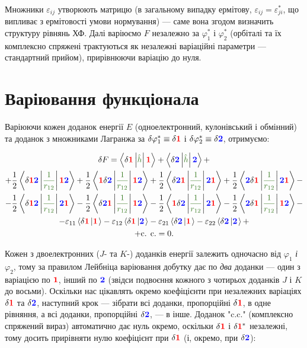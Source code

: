\documentclass[]{article}
\def\bracket#1#2{\left\langle #1\left| #2 \right. \right\rangle }
\def\opbracket#1#2#3{\left\langle #1\left| \textcolor{OliveGreen}{#2}\right|  #3 \right\rangle}
\let\vphi\varphi
\let\ve\varepsilon
\def\F{\textcolor{red}{\mathbf{1}}}
\def\S{\textcolor{blue}{\mathbf{2}}}
\def\h{\hat{h}}
\def\V{\frac{1}{r_{12}}}
\begin{document}
Множники $\ve_{ij}$ утворюють матрицю (в загальному випадку ермітову, $\ve_{ij}=\ve_{ji}^*$, що випливає з ермітовості умови нормування) --- саме вона згодом визначить структуру рівнянь ХФ. Далі варіюємо $F$ незалежно за $\vphi_1^*$ і $\vphi_2^*$ (орбіталі та їх комплексно спряжені трактуються як незалежні варіаційні параметри --- стандартний прийом), прирівнюючи варіацію до нуля.

\section{Варіювання функціонала}

Варіюючи кожен доданок енергії $E$ (одноелектронний, кулонівський і обмінний) та доданок з множниками Лагранжа за $\delta\vphi_1^*\equiv\delta\F$ і $\delta\vphi_2^*\equiv\delta\S$, отримуємо:

\begin{multline*}
    \delta F =  \opbracket{\delta\F}{\h}{\F} + \opbracket{\delta\S}{\h}{\S} + \\
    + \frac12\opbracket{\delta\F\S}{\V}{\F\S} + \frac12\opbracket{\F\delta\S}{\V}{\F\S} +
    \frac12\opbracket{\delta\S\F}{\V}{\S\F} + \frac12\opbracket{\S\delta\F}{\V}{\S\F} - \\
    - \frac12\opbracket{\delta\F\S}{\V}{\S\F} - \frac12\opbracket{\delta\S\F}{\V}{\F\S}
    - \frac12\opbracket{\F\delta\S}{\V}{\S\F} - \frac12\opbracket{\S\delta\F}{\V}{\F\S} - \\
    - \ve_{11} \bracket{\delta\F}{\F}
    - \ve_{12} \bracket{\delta\F}{\S}
    - \ve_{21} \bracket{\delta\S}{\F}
    - \ve_{22} \bracket{\delta\S}{\S} + \\
    + \text{c. c.} = 0 .
\end{multline*}

Кожен з двоелектронних ($J$- та $K$-) доданків енергії залежить одночасно від $\vphi_1$ \emph{і} $\vphi_2$, тому за правилом Лейбніца варіювання добутку дає по \emph{два} доданки --- один з варіацією по $\F$, інший по $\S$ (звідси подвоєння кожного з чотирьох доданків $J$ і $K$ до восьми). Оскільки нас цікавлять окремо коефіцієнти при незалежних варіаціях $\delta\F$ та $\delta\S$, наступний крок --- зібрати всі доданки, пропорційні $\delta\F$, в одне рівняння, а всі доданки, пропорційні $\delta\S$, --- в інше. Доданок "c.c." (комплексно спряжений вираз) автоматично дає нуль окремо, оскільки $\delta\F$ і $\delta\F^*$ незалежні, тому досить прирівняти нулю коефіцієнт при $\delta\F$ (і, окремо, при $\delta\S$):
\end{document}
